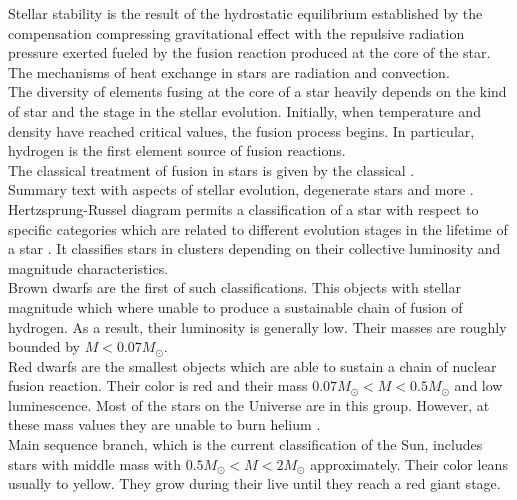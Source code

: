\documentclass[openany]{book}
\begin{document}
Stellar stability is the result of the hydrostatic equilibrium established by the compensation compressing gravitational effect with the repulsive radiation pressure exerted fueled by the fusion reaction produced at the core of the star. The mechanisms of heat exchange in stars are radiation and convection. \\

The diversity of elements fusing at the core of a star heavily depends on the kind of star and the stage in the stellar evolution.  Initially, when temperature and density have reached critical values, the fusion process begins. In particular, hydrogen is the first element source of fusion reactions. \\

The classical treatment of fusion in stars is given by the classical \cite{burbidge_burbidge_fowler_hoyle_1957}. \\

Summary text with aspects of stellar evolution, degenerate stars and more \cite{kundt_2005}. \\

Hertzsprung-Russel diagram permits a classification of a star with respect to specific categories which are related to different evolution stages in the lifetime of a star \cite{arsentieva_shevchenko_2021}. It classifies stars in clusters depending on their collective luminosity and magnitude characteristics. \\

Brown dwarfs are the first of such classifications. This objects with stellar magnitude which where unable to produce a sustainable chain of fusion of hydrogen. As a result, their luminosity is generally low. Their masses are roughly bounded by $M < 0.07M_{\odot}$. \\

Red dwarfs are the smallest objects which are able to sustain a chain of nuclear fusion reaction. Their color is red and their mass $ 0.07M_{\odot} < M < 0.5 M_{\odot} $ and low luminescence. Most of the stars on the Universe are in this group. However, at these mass values they are unable to burn helium \cite{kundt_2005}. \\

Main sequence branch, which is the current classification of the Sun, includes stars with middle mass with $ 0.5M_{\odot} < M < 2M_{\odot}$ approximately. Their color leans usually to yellow. They grow during their live until they reach a red giant stage. \\
\end{document}
